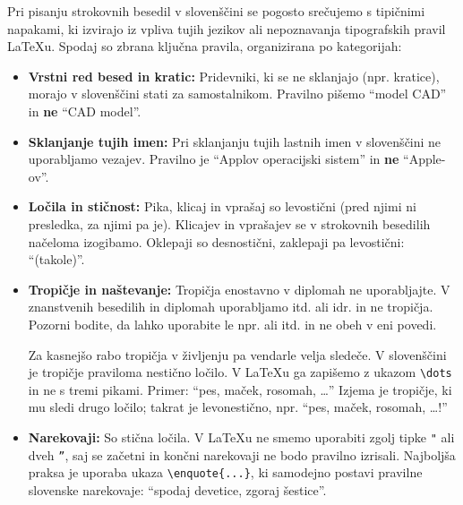\documentclass[a4paper,12pt,openright]{book}
\begin{document}
Pri pisanju strokovnih besedil v slovenščini se pogosto srečujemo s tipičnimi napakami, ki izvirajo iz vpliva tujih jezikov ali nepoznavanja tipografskih pravil \LaTeX u. Spodaj so zbrana ključna pravila, organizirana po kategorijah:

\begin{itemize}
    \item \textbf{Vrstni red besed in kratic:} Pridevniki, ki se ne sklanjajo (npr. kratice), morajo v slovenščini stati za samostalnikom. Pravilno pišemo \enquote{model CAD} in \textbf{ne} \enquote{CAD model}.
    
    \item \textbf{Sklanjanje tujih imen:} Pri sklanjanju tujih lastnih imen v slovenščini ne uporabljamo vezajev. Pravilno je \enquote{Applov operacijski sistem} in \textbf{ne} \enquote{Apple-ov}.
    
    \item \textbf{Ločila in stičnost:} Pika, klicaj in vprašaj so levostični (pred njimi ni presledka, za njimi pa je). Klicajev in vprašajev se v strokovnih besedilih načeloma izogibamo. Oklepaji so desnostični, zaklepaji pa levostični: \enquote{(takole)}.
    
    \item \textbf{Tropičje in naštevanje:} Tropičja enostavno v diplomah ne uporabljajte. V znanstvenih besedilih in diplomah uporabljamo itd. ali idr. in ne tropičja. Pozorni bodite, da lahko uporabite le npr. ali itd. in ne obeh v eni povedi.
    
    Za kasnejšo rabo tropičja v življenju pa vendarle velja sledeče. V slovenščini je tropičje praviloma nestično ločilo. V \LaTeX u ga zapišemo z ukazom \texttt{\textbackslash dots} in ne s tremi pikami. Primer: \enquote{pes, maček, rosomah, \dots} Izjema je tropičje, ki mu sledi drugo ločilo; takrat je levonestično, npr. \enquote{pes, maček, rosomah, \dots!}
    
    \item \textbf{Narekovaji:} So stična ločila. V \LaTeX u ne smemo uporabiti zgolj tipke \texttt{"} ali dveh \texttt{''}, saj se začetni in končni narekovaji ne bodo pravilno izrisali. Najboljša praksa je uporaba ukaza \texttt{\textbackslash enquote\{...\}}, ki samodejno postavi pravilne slovenske narekovaje: \enquote{spodaj devetice, zgoraj šestice}.
    

\end{itemize}
\end{document}
